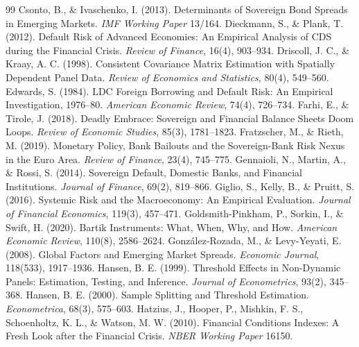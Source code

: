 \begin{thebibliography}{99}
 Csonto, B., \& Ivaschenko, I. (2013). Determinants of Sovereign Bond Spreads in Emerging Markets. \textit{IMF Working Paper} 13/164.
 Dieckmann, S., \& Plank, T. (2012). Default Risk of Advanced Economies: An Empirical Analysis of CDS during the Financial Crisis. \textit{Review of Finance}, 16(4), 903--934.
 Driscoll, J. C., \& Kraay, A. C. (1998). Consistent Covariance Matrix Estimation with Spatially Dependent Panel Data. \textit{Review of Economics and Statistics}, 80(4), 549--560.
 Edwards, S. (1984). LDC Foreign Borrowing and Default Risk: An Empirical Investigation, 1976--80. \textit{American Economic Review}, 74(4), 726--734.
 Farhi, E., \& Tirole, J. (2018). Deadly Embrace: Sovereign and Financial Balance Sheets Doom Loops. \textit{Review of Economic Studies}, 85(3), 1781--1823.
 Fratzscher, M., \& Rieth, M. (2019). Monetary Policy, Bank Bailouts and the Sovereign-Bank Risk Nexus in the Euro Area. \textit{Review of Finance}, 23(4), 745--775.
 Gennaioli, N., Martin, A., \& Rossi, S. (2014). Sovereign Default, Domestic Banks, and Financial Institutions. \textit{Journal of Finance}, 69(2), 819--866.
 Giglio, S., Kelly, B., \& Pruitt, S. (2016). Systemic Risk and the Macroeconomy: An Empirical Evaluation. \textit{Journal of Financial Economics}, 119(3), 457--471.
 Goldsmith-Pinkham, P., Sorkin, I., \& Swift, H. (2020). Bartik Instruments: What, When, Why, and How. \textit{American Economic Review}, 110(8), 2586--2624.
 González-Rozada, M., \& Levy-Yeyati, E. (2008). Global Factors and Emerging Market Spreads. \textit{Economic Journal}, 118(533), 1917--1936.
 Hansen, B. E. (1999). Threshold Effects in Non-Dynamic Panels: Estimation, Testing, and Inference. \textit{Journal of Econometrics}, 93(2), 345--368.
 Hansen, B. E. (2000). Sample Splitting and Threshold Estimation. \textit{Econometrica}, 68(3), 575--603.
 Hatzius, J., Hooper, P., Mishkin, F. S., Schoenholtz, K. L., \& Watson, M. W. (2010). Financial Conditions Indexes: A Fresh Look after the Financial Crisis. \textit{NBER Working Paper} 16150.

\end{thebibliography}
